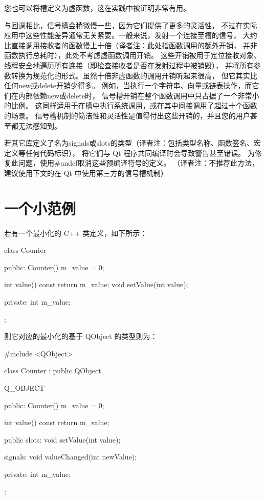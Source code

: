 您也可以将槽定义为虚函数，这在实践中被证明非常有用。

与回调相比，信号槽会稍微慢一些，因为它们提供了更多的灵活性，
不过在实际应用中这些性能差异通常无关紧要。一般来说，发射一个连接至槽的信号，
大约比直接调用接收者的函数慢上十倍（译者注：此处指函数调用的额外开销，
并非函数执行总耗时），此处不考虑虚函数调用开销。
这些开销被用于定位接收对象、线程安全地遍历所有连接（即检查接收者是否在发射过程中被销毁），
并将所有参数转换为规范化的形式。虽然十倍非虚函数的调用开销听起来很高，
但它其实比任何new或delete开销少得多。
例如，当执行一个字符串、向量或链表操作，而它们在内部依赖new或delete时，
信号槽开销在整个函数调用中只占据了一个非常小的比例。
这同样适用于在槽中执行系统调用，或在其中间接调用了超过十个函数的场景。
信号槽机制的简洁性和灵活性是值得付出这些开销的，并且您的用户甚至都无法感知到。

\begin{notice}
若其它库定义了名为signals或slots的类型（译者注：包括类型名称、函数签名、宏定义等任何代码标识），
将它们与 Qt 程序共同编译时会导致警告甚至错误。
为修复此问题，使用\#undef取消这些预编译符号的定义。
（译者注：不推荐此方法，建议使用下文的在 Qt 中使用第三方的信号槽机制）
\end{notice}

\section{一个小范例}

若有一个最小化的 C++ 类定义，如下所示：

\begin{cppcode}
 class Counter
 {
 public:
     Counter() { m_value = 0; }

     int value() const { return m_value; }
     void setValue(int value);

 private:
     int m_value;
 };
\end{cppcode}

则它对应的最小化的基于 QObject 的类型则为：

\begin{cppcode}
 #include <QObject>

class Counter : public QObject
{
	Q_OBJECT

public:
	Counter() { m_value = 0; }

	int value() const { return m_value; }

public slots:
	void setValue(int value);

signals:
	void valueChanged(int newValue);

private:
	int m_value;
};
\end{cppcode}

